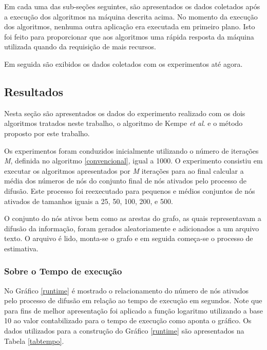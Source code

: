 \documentclass{acm_proc_article-sp}
\begin{document}
Em cada uma das sub-seções seguintes, são apresentados os dados coletados após a execução dos algoritmos na
máquina descrita acima. No momento da execução dos algoritmos, nenhuma outra aplicação era executada em primeiro
plano. Isto foi feito para proporcionar que aos algoritmos uma rápida resposta da máquina utilizada quando da
requisição de mais recursos.

Em seguida são exibidos os dados coletados com os experimentos até agora.

\subsection{Resultados}
Nesta seção são apresentados os dados do experimento realizado com os dois algoritmos tratados neste trabalho, o
algoritmo de Kempe \textit{et al}. e o método proposto por este trabalho.

Os experimentos foram conduzidos inicialmente utilizando o número de iterações \textit{M}, definida no algoritmo
\ref{convencional}, igual a 1000. O experimento consistiu em executar os algoritmos apresentados por \textit{M}
iterações para ao final calcular a média dos números de nós do conjunto final de nós ativados pelo processo de
difusão. Este processo foi reexecutado para pequenos e médios conjuntos de nós ativados de tamanhos iguais a 25,
50, 100, 200, e 500.

O conjunto do nós ativos bem como as arestas do grafo, as quais representavam a difusão da informação, foram 
gerados aleatoriamente e adicionados a um arquivo texto. O arquivo é lido, monta-se o grafo e em seguida começa-se
o processo de estimativa.

\subsubsection{Sobre o Tempo de execução}
No Gráfico \ref{runtime} é mostrado o relacionamento do número de nós ativados pelo processo de difusão em relação
ao tempo de execução em segundos. Note que para fins de melhor apresentação foi aplicado a função logaritmo
utilizando a base 10 ao valor contabilizado para o tempo de execução como aponta o gráfico. Os dados utilizados
para a construção do Gráfico \ref{runtime} são apresentados na Tabela \ref{tabtempo}.
\end{document}
